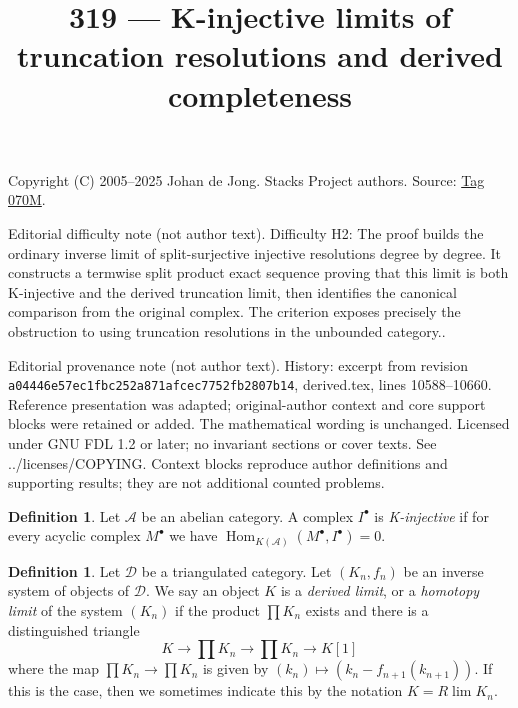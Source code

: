 \documentclass{amsart}
\theoremstyle{plain}
\theoremstyle{definition}
\newtheorem{definition}[subsection]{Definition}
\theoremstyle{remark}
\numberwithin{equation}{subsection}
\def\lim{\mathop{\mathrm{lim}}\nolimits}
\def\Hom{\mathop{\mathrm{Hom}}\nolimits}
\begin{document}
\title[Stacks Project, Tag 070M]{319 --- K-injective limits of truncation resolutions and derived completeness}
\maketitle
\noindent Copyright (C) 2005--2025 Johan de Jong. Stacks Project authors. Source: \href{https://stacks.math.columbia.edu/tag/070M}{Tag 070M}.

\noindent Editorial difficulty note (not author text). Difficulty H2: The proof builds the ordinary inverse limit of split-surjective injective resolutions degree by degree. It constructs a termwise split product exact sequence proving that this limit is both K-injective and the derived truncation limit, then identifies the canonical comparison from the original complex. The criterion exposes precisely the obstruction to using truncation resolutions in the unbounded category..

\noindent Editorial provenance note (not author text). History: excerpt from revision \texttt{a0444\allowbreak 6e57e\allowbreak c1fbc\allowbreak 252a8\allowbreak 71afc\allowbreak ec775\allowbreak 2fb28\allowbreak 07b14}, derived.tex, lines 10588--10660. Reference presentation was adapted; original-author context and core support blocks were retained or added. The mathematical wording is unchanged. Licensed under GNU FDL 1.2 or later; no invariant sections or cover texts. See ../licenses/COPYING. Context blocks reproduce author definitions and supporting results; they are not additional counted problems.

\begin{definition}
\label{definition-K-injective}
Let $\mathcal{A}$ be an abelian category. A complex $I^\bullet$
is {\it K-injective} if for every acyclic complex $M^\bullet$ we
have $\Hom_{K(\mathcal{A})}(M^\bullet, I^\bullet) = 0$.
\end{definition}

\begin{definition}
\label{definition-derived-limit}
Let $\mathcal{D}$ be a triangulated category.
Let $(K_n, f_n)$ be an inverse system of objects of $\mathcal{D}$.
We say an object $K$ is a {\it derived limit}, or a
{\it homotopy limit} of the system $(K_n)$ if
the product $\prod K_n$ exists and there is a distinguished triangle
$$
K \to \prod K_n \to \prod K_n \to K[1]
$$
where the map $\prod K_n \to \prod K_n$ is given
by $(k_n) \mapsto (k_n - f_{n + 1}(k_{n + 1}))$. If this is the
case, then we sometimes indicate this by the notation $K = R\lim K_n$.
\end{definition}
\end{document}
